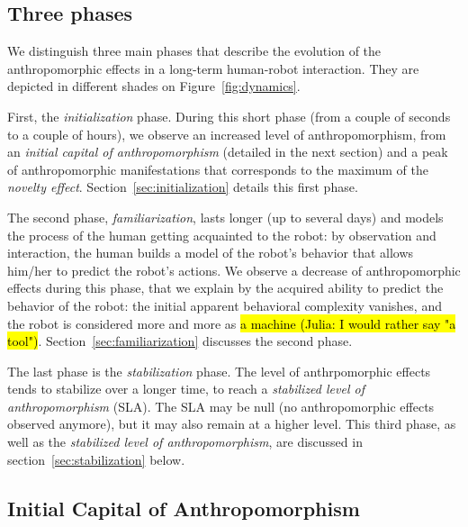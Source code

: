 \documentclass[lettersize, apacite, twoside, HRI]{apa_HRI}
\begin{document}
\subsection{Three phases}
\label{sec:phases}

We distinguish three main phases that describe the evolution of the
anthropomorphic effects in a long-term human-robot interaction. They are
depicted in different shades on Figure~\ref{fig:dynamics}.

First, the \emph{initialization} phase. During this short phase (from a couple
of seconds to a couple of hours), we observe an increased level of
anthropomorphism, from an \emph{initial capital of anthropomorphism}
(detailed in the next section) and a peak of anthropomorphic manifestations
that corresponds to the maximum of the \emph{novelty effect}.
Section~\ref{sec:initialization} details this first phase.

The second phase, \emph{familiarization}, lasts longer (up to several days) and
models the process of the human getting acquainted to the robot: by observation
and interaction, the human builds a model of the robot's behavior that allows
him/her to predict the robot's actions. We observe a decrease of
anthropomorphic effects during this phase, that we explain by the acquired
ability to predict the behavior of the robot: the initial apparent behavioral
complexity vanishes, and the robot is considered more and more as \hl{a machine (Julia: I would rather say "a tool")}.
Section~\ref{sec:familiarization} discusses the second phase.

The last phase is the \emph{stabilization} phase. The level of anthrpomorphic
effects tends to stabilize over a longer time, to reach a \emph{stabilized
level of anthropomorphism} (SLA). The SLA may be null (no anthropomorphic
effects observed anymore), but it may also remain at a higher level.  This
third phase, as well as the \emph{stabilized level of anthropomorphism}, are
discussed in section~\ref{sec:stabilization} below.


\subsection{Initial Capital of Anthropomorphism}
\label{sec:ica}
\end{document}
